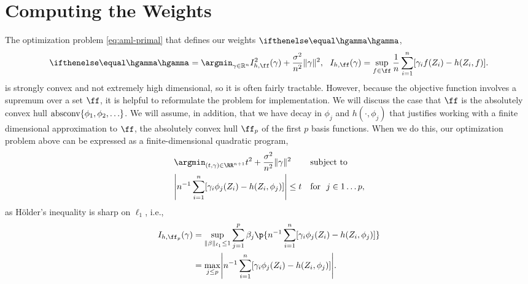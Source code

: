 \section{Computing the Weights}
\label{sec:computation}

The optimization problem \eqref{eq:aml-primal} that defines our weights $\hriesz$, 
\[ \hriesz = \argmin_{\gamma \in \R^n} I_{h,\ff}^2(\gamma) + \frac{\sigma^2}{n^2}\norm{\gamma}^2,
\ \ I_{h,\ff}(\gamma) = \sup_{f \in \ff} \frac{1}{n} \sum_{i = 1}^n [\gamma_i f(Z_i) - h(Z_i,f)]. \] 
is strongly convex and not extremely high dimensional, so it is often fairly tractable.
However, because the objective function involves a supremum over a set $\ff$,
 it is helpful to reformulate the problem for implementation. We will discuss the case
that $\ff$ is the absolutely convex hull $\operatorname*{absconv}\{\phi_1,\phi_2, \ldots\}$.
We will assume, in addition, that we have decay in $\phi_j$ and $h(\cdot,\phi_j)$ that justifies working with a finite
dimensional approximation to $\ff$, the absolutely convex hull
$\ff_p$ of the first $p$ basis functions. When we do this, our optimization problem above can be expressed as a finite-dimensional quadratic program,
\begin{align*}
&\argmin_{(t, \gamma) \in \RR^{n+1}} t^2 + \frac{\sigma^2}{n^2}\norm{\gamma}^2 && \text{subject to}\ \\
& \abs*{n^{-1}\sum_{i=1}^n[ \gamma_i \phi_j(Z_i) - h(Z_i,\phi_j)] } \le t && \text{for }\ j \in 1 \ldots p,
\end{align*} 
as H\"older's inequality is sharp on $\ell_1$, i.e.,
\begin{align*} 
I_{h,\ff_p}(\gamma)&=\sup_{\norm{\beta}_{\ell_1} \le 1} \sum_{j=1}^p\beta_j \p{n^{-1}\sum_{i=1}^n[\gamma_i \phi_j(Z_i) - h(Z_i,\phi_j)]} \\
    &= \max_{j \le p} \abs*{n^{-1}\sum_{i=1}^n [\gamma_i \phi_j(Z_i) - h(Z_i,\phi_j)]}.
\end{align*} 

